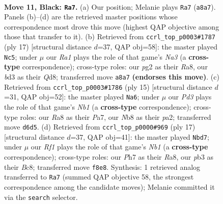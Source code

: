 \documentclass[11pt]{article}
\begin{document}
\clearpage

\begin{figure}[p]\centering
\begin{subfigure}{0.46\textwidth}\centering
\resizebox{\linewidth}{!}{%
\newchessgame
\chessboard[
  setfen={rnbq1rk1/1p2bppp/p2p1n2/4p3/P3P3/1PNB1N2/2P2PPP/R1BQ1RK1 b - - 2 11},
  showmover=false,
  pgfstyle=straightmove, color=movearrow, markmove={a8-a7}
]}
\caption{}
\end{subfigure}\hfill
\begin{subfigure}{0.46\textwidth}\centering
\resizebox{\linewidth}{!}{%
\newchessgame
\chessboard[
  setfen={r1bq1rk1/pp2bppp/n1pp1n2/8/3NPB2/2N3P1/PPP2PBP/R2Q1RK1 b - - 3 9},
  showmover=false,
  pgfstyle=straightmove, color=movearrow, markmove={a6-c5}
]}
\caption{}
\end{subfigure}
\\[4pt]
\begin{subfigure}{0.46\textwidth}\centering
\resizebox{\linewidth}{!}{%
\newchessgame
\chessboard[
  setfen={rnbq1rk1/pp2bppp/2pp1n2/8/3NP3/2N3P1/PPP2PBP/R1BQ1RK1 b - - 1 8},
  showmover=false,
  pgfstyle=straightmove, color=movearrow, markmove={b8-a6}
]}
\caption{}
\end{subfigure}\hfill
\begin{subfigure}{0.46\textwidth}\centering
\resizebox{\linewidth}{!}{%
\newchessgame
\chessboard[
  setfen={rnbq1rk1/p1p1bppp/1p3n2/3p4/3P4/P1NBPN2/1P3PPP/R1BQ1RK1 b - - 1 9},
  showmover=false,
  pgfstyle=straightmove, color=movearrow, markmove={b8-d7}
]}
\caption{}
\end{subfigure}
\caption{\textbf{Move 11, Black: \texttt{Ra7}.} (a) Our position; Melanie plays \texttt{Ra7} (\texttt{a8a7}). Panels (b)--(d) are the retrieved master positions whose correspondence most drove this move (highest QAP objective among those that transfer to it). (b) Retrieved from \texttt{ccrl\_top\_p0003\#1787} (ply 17) [structural distance $d$=37, QAP obj=58]: the master played \texttt{Nc5}; under $\mu$ our \emph{Ra1} plays the role of that game's \emph{Na3} (a \textbf{cross-type} correspondence); cross-type roles: our \emph{p}g2 as their \emph{R}a8, our \emph{b}d3 as their \emph{Q}d8; transferred move \texttt{a8a7} \textbf{(endorses this move)}. (c) Retrieved from \texttt{ccrl\_top\_p0003\#1786} (ply 15) [structural distance $d$=31, QAP obj=52]: the master played \texttt{Na6}; under $\mu$ our \emph{Pd3} plays the role of that game's \emph{Nb1} (a \textbf{cross-type} correspondence); cross-type roles: our \emph{R}a8 as their \emph{P}a7, our \emph{N}b8 as their \emph{p}a2; transferred move \texttt{d6d5}. (d) Retrieved from \texttt{ccrl\_top\_p0000\#969} (ply 17) [structural distance $d$=37, QAP obj=41]: the master played \texttt{Nbd7}; under $\mu$ our \emph{Rf1} plays the role of that game's \emph{Nb1} (a \textbf{cross-type} correspondence); cross-type roles: our \emph{P}h7 as their \emph{R}a8, our \emph{p}b3 as their \emph{B}c8; transferred move \texttt{f8e8}. Synthesis: 1 retrieved analog transferred to \texttt{Ra7} (summed QAP objective 58, the strongest correspondence among the candidate moves); Melanie committed it via the \texttt{search} selector.}
\label{fig:thought-m21}
\end{figure}
\end{document}
